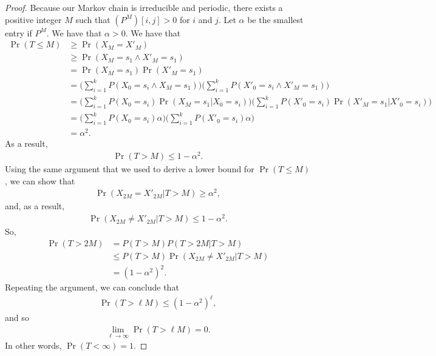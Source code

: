 \documentclass[10pt]{article}
\begin{document}
\begin{itemize}
\begin{proof}
    Because our Markov chain is irreducible and periodic, there exists a positive integer $M$ such that $(P^M)[i,j] > 0$ for $i$ and $j$. Let $\alpha$ be the smallest entry if $P^M$. We have that $\alpha > 0$. We have that
    \begin{align*}
        \Pr(T \leq M)
        &\geq \Pr(X_M = X'_M) \\
        &\geq \Pr(X_M = s_1 \wedge X'_M = s_1) \\
        &= \Pr(X_M = s_1)\Pr(X'_M = s_1) \\
        &= \bigg( \sum_{i=1}^k P(X_0 = s_i \wedge X_M = s_1) \bigg) \bigg( \sum_{i=1}^k P(X'_0 = s_i \wedge X'_M = s_1) \bigg) \\
        &= \bigg( \sum_{i=1}^k P(X_0 = s_i)\Pr(X_M = s_1| X_0 = s_i) \bigg) \bigg( \sum_{i=1}^k P(X'_0 = s_i) \Pr(X'_M = s_1|X'_0 = s_i) \bigg) \\
        &= \bigg( \sum_{i=1}^k P(X_0 = s_i) \alpha \bigg) \bigg( \sum_{i=1}^k P(X'_0 = s_i) \alpha \bigg) \\
        &= \alpha^2.
    \end{align*}
    As a result,
    \begin{align*}
        \Pr(T > M) \leq 1 - \alpha^2.
    \end{align*}
    Using the same argument that we used to derive a lower bound for $\Pr(T \leq M)$, we can show that 
    \begin{align*}
        \Pr(X_{2M} = X'_{2M} | T > M) \geq \alpha^2,
    \end{align*}
    and, as a result,
    \begin{align*}
        \Pr(X_{2M} \neq X'_{2M} | T > M) \leq 1 - \alpha^2.
    \end{align*}
    So,
    \begin{align*}
        \Pr(T > 2M) 
        &= P(T > M) P(T > 2M | T > M) \\
        &\leq P(T > M) \Pr(X_{2M} \neq X'_{2M} | T > M) \\
        &= (1 - \alpha^2)^2.
    \end{align*}
    Repeating the argument, we can conclude that
    \begin{align*}
        \Pr(T > \ell M) \leq (1 - \alpha^2)^\ell,
    \end{align*}
    and so
    \begin{align*}
        \lim_{\ell \rightarrow \infty} \Pr(T > \ell M) = 0.
    \end{align*}
    In other words, $\Pr(T < \infty) = 1$.


\end{proof}
\end{itemize}
\end{document}
